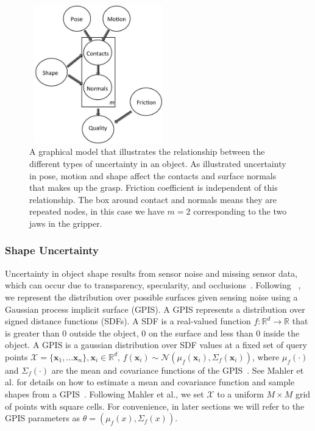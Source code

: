 \documentclass[a4paper, 10pt, conference]{ieeeconf}      %
\newcommand{\bx}{\mathbf{x}}
\newcommand{\mX}{\mathcal{X}}
\newcommand{\mN}{\mathcal{N}}
\begin{document}
\begin{figure}[ht!]
\centering
\includegraphics[width = 6cm, height = 6cm]{figures/Graphical_Model.jpg}
\caption{A graphical model that illustrates the relationship between the different types of uncertainty in an object. As illustrated uncertainty in pose, motion and shape affect the contacts and surface normals that makes up the grasp. Friction coefficient is independent of this relationship. The box around contact and normals means they are repeated nodes, in this case we have $m=2$ corresponding to the two jaws in the gripper.  }
\vspace*{-10pt}
\label{fig:graphical_model}
\end{figure}

\subsubsection{Shape Uncertainty}

Uncertainty in object shape results from sensor noise and missing sensor data, which can occur due to transparency, specularity, and occlusions~\cite{mahler2015gp}.
Following ~\cite{mahler2015gp}, we represent the distribution over possible surfaces given sensing noise using a Gaussian process implicit surface (GPIS).
A GPIS represents a distribution over signed distance functions (SDFs).
A SDF is a real-valued function $f: \mathbb{R}^d \rightarrow \mathbb{R}$ that is greater than 0 outside the object, 0 on the surface and less than 0 inside the object.
A GPIS is a gaussian distribution over SDF values at a fixed set of query points $\mX = \{\bx_1, ... \bx_n\}, \bx_i \in \mathbb{R}^d$, $f(\bx_i) \sim \mN(\mu_{f}(\bx_i),\Sigma_{f}(\bx_i))$, where $\mu_{f}(\cdot)$ and $\Sigma_{f}(\cdot)$ are the mean and covariance functions of the GPIS~\cite{rasmussen2006}.
See Mahler et al. for details on how to estimate a mean and covariance function and sample shapes from a GPIS~\cite{mahler2015gp}.
Following Mahler et al., we set $\mX$ to a uniform $M \times M$ grid of points with square cells.
For convenience, in later sections we will refer to the GPIS parameters as $\theta = \left( \mu_{f}(x), \Sigma_{f}(x) \right)$. 
\end{document}
